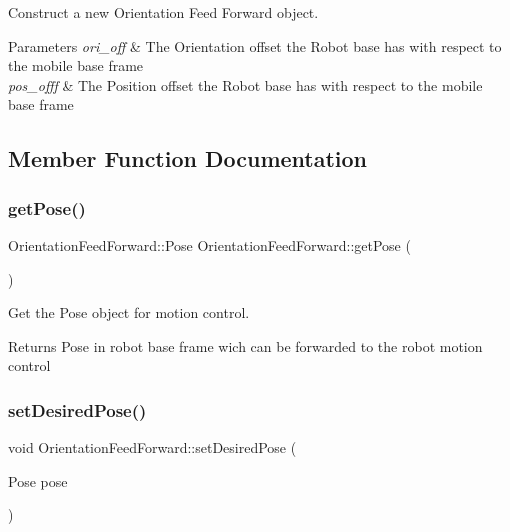 Construct a new Orientation Feed Forward object. 


\begin{DoxyParams}{Parameters}
{\em ori\+\_\+off} & The Orientation offset the Robot base has with respect to the mobile base frame \\
\hline
{\em pos\+\_\+offf} & The Position offset the Robot base has with respect to the mobile base frame \\
\hline
\end{DoxyParams}


\subsection{Member Function Documentation}
\mbox{\label{classOrientationFeedForward_ad31fce2cdf39cbf375457b9aa7ca2219}} 
\subsubsection{\texorpdfstring{get\+Pose()}{getPose()}}
{\footnotesize\ttfamily Orientation\+Feed\+Forward\+::\+Pose Orientation\+Feed\+Forward\+::get\+Pose (\begin{DoxyParamCaption}{ }\end{DoxyParamCaption})}



Get the Pose object for motion control. 

\begin{DoxyReturn}{Returns}
Pose in robot base frame wich can be forwarded to the robot motion control 
\end{DoxyReturn}
\mbox{\label{classOrientationFeedForward_a5f69dfd449972707d2ccd07e20fd2c5b}} 
\subsubsection{\texorpdfstring{set\+Desired\+Pose()}{setDesiredPose()}\hspace{0.1cm}{\footnotesize\ttfamily [1/2]}}
{\footnotesize\ttfamily void Orientation\+Feed\+Forward\+::set\+Desired\+Pose (\begin{DoxyParamCaption}\item[{Pose}]{pose }\end{DoxyParamCaption})}



